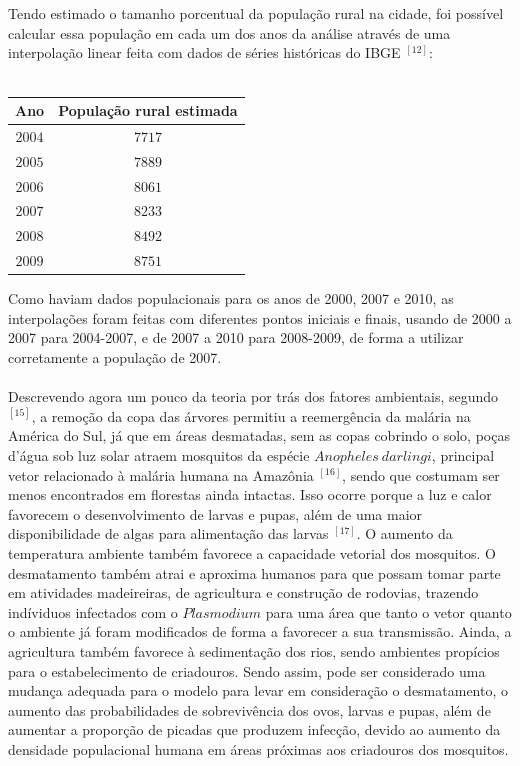 \documentclass[12pt]{article}
\begin{document}
\\\\
Tendo estimado o tamanho porcentual da população rural na cidade, foi possível calcular essa população em cada um dos anos da análise através de uma interpolação linear feita com dados de séries históricas do IBGE $^{[12]}$:
\\\\
\begin{adjustwidth}{0cm}{}
\begin{center}
\renewcommand{\arraystretch}{1.5}
\begin{tabular}{|c | c|} 
 \hline
 \textbf{Ano} & \textbf{População rural estimada}\\ 
 \hline
$2004$ & $7717$ \\
 \hline
 $2005$ & $7889$ \\
 \hline
 $2006$ & $8061$ \\
 \hline
 $2007$ & $8233$ \\
 \hline
 $2008$ & $8492$ \\
 \hline
 $2009$ & $8751$ \\
 \hline
\end{tabular}
\end{center}
\end{adjustwidth}

\vspace{1cm}
Como haviam dados populacionais para os anos de 2000, 2007 e 2010, as interpolações foram feitas com diferentes pontos iniciais e finais, usando de 2000 a 2007 para 2004-2007, e de 2007 a 2010 para 2008-2009, de forma a utilizar corretamente a população de 2007.
\\\\
Descrevendo agora um pouco da teoria por trás dos fatores ambientais, segundo $^{[15]}$, 
a remoção da copa das árvores permitiu a reemergência da malária 
na América do Sul, já que em áreas desmatadas, 
sem as copas cobrindo o solo, poças d'água sob luz solar atraem mosquitos 
da espécie $Anopheles \ darlingi$, principal vetor relacionado à malária 
humana na Amazônia $^{[16]}$, sendo que costumam ser menos encontrados em 
florestas ainda intactas. Isso ocorre porque a luz e calor favorecem o 
desenvolvimento de larvas e pupas, além de uma maior disponibilidade de 
algas para alimentação das larvas $^{[17]}$. O aumento da temperatura 
ambiente também favorece a capacidade vetorial dos mosquitos. O desmatamento 
também atrai e aproxima humanos para que possam tomar parte em atividades 
madeireiras, de agricultura e construção de rodovias, trazendo indíviduos 
infectados com o $Plasmodium$ para uma área que tanto o vetor quanto o 
ambiente já foram modificados de forma a favorecer a sua transmissão. 
Ainda, a agricultura também favorece à sedimentação dos rios, sendo 
ambientes propícios para o estabelecimento de criadouros. Sendo assim, 
pode ser considerado uma mudança adequada para o modelo para levar 
em consideração o desmatamento, o aumento das probabilidades de 
sobrevivência dos ovos, larvas e pupas, além de aumentar a proporção 
de picadas que produzem infecção, devido ao aumento da densidade 
populacional humana em áreas próximas aos criadouros dos mosquitos.
\newpage
\end{document}
